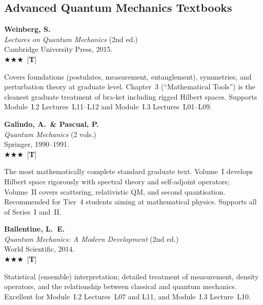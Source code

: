 \documentclass[11pt,a4paper]{article}
\newcommand{\essential}{$\bigstar\bigstar\bigstar$}
\newenvironment{bibentry}[1]{\begin{tcolorbox}[entrybox=#1,top=4pt,bottom=4pt]}{\end{tcolorbox}\smallskip}
\begin{document}
\subsection{Advanced Quantum Mechanics Textbooks}

\begin{bibentry}{t4light}
\textbf{Weinberg, S.}\\
\textit{Lectures on Quantum Mechanics} (2nd ed.)\\
Cambridge University Press, 2015.\\[3pt]
\essential\ [\textbf{T}]\\[3pt]
\begin{tcolorbox}[annotbox]
Covers foundations (postulates, measurement, entanglement), symmetries, and
perturbation theory at graduate level. Chapter~3 (``Mathematical Tools'') is the
cleanest graduate treatment of bra-ket including rigged Hilbert spaces.
Supports Module~I.2 Lectures~L11--L12 and Module~I.3 Lectures~L01--L09.
\end{tcolorbox}
\end{bibentry}

\begin{bibentry}{t4light}
\textbf{Galindo, A.\ \& Pascual, P.}\\
\textit{Quantum Mechanics} (2 vols.)\\
Springer, 1990--1991.\\[3pt]
\essential\ [\textbf{T}]\\[3pt]
\begin{tcolorbox}[annotbox]
The most mathematically complete standard graduate text. Volume~I develops Hilbert
space rigorously with spectral theory and self-adjoint operators; Volume~II covers
scattering, relativistic QM, and second quantisation. Recommended for Tier~4
students aiming at mathematical physics. Supports all of Series~I and~II.
\end{tcolorbox}
\end{bibentry}

\begin{bibentry}{t4light}
\textbf{Ballentine, L.~E.}\\
\textit{Quantum Mechanics: A Modern Development} (2nd ed.)\\
World Scientific, 2014.\\[3pt]
\essential\ [\textbf{T}]\\[3pt]
\begin{tcolorbox}[annotbox]
Statistical (ensemble) interpretation; detailed treatment of measurement, density
operators, and the relationship between classical and quantum mechanics. Excellent
for Module~I.2 Lectures~L07 and L11, and Module~I.3 Lecture~L10.
\end{tcolorbox}
\end{bibentry}
\end{document}
